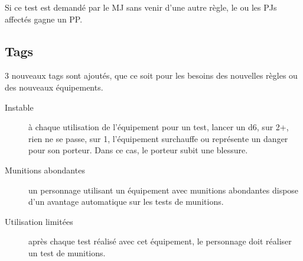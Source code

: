 \documentclass[10pt,a4paper]{article}
\begin{document}
Si ce test est demandé par le MJ sans venir d'une autre règle, le ou les PJs affectés gagne un PP.
\subsection{Tags}
3 nouveaux tags sont ajoutés, que ce soit pour les besoins des nouvelles règles ou des nouveaux équipements.
\begin{description}
\item[Instable] à chaque utilisation de l'équipement pour un test, lancer un d6, sur 2+, rien ne se passe, sur 1, l'équipement surchauffe ou représente un danger pour son porteur. Dans ce cas, le porteur subit une blessure.
\item[Munitions abondantes]un personnage utilisant un équipement avec munitions abondantes dispose d'un avantage automatique sur les tests de munitions.
\item[Utilisation limitées]après chaque test réalisé avec cet équipement, le personnage doit réaliser un test de munitions.
\end{description}
\end{document}
